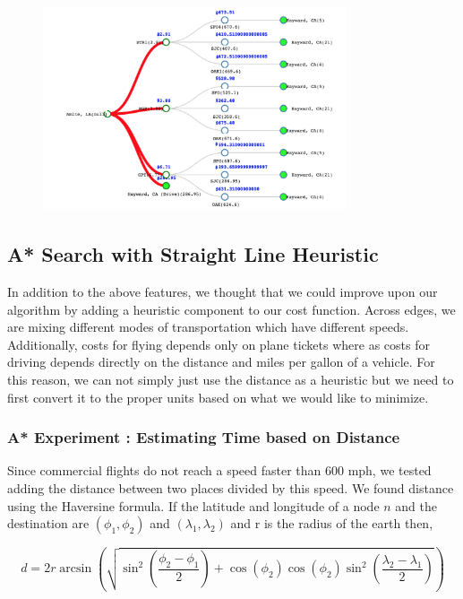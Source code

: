 \documentclass[11pt]{article}
\begin{document}
\begin{figure}[!ht]
  \centering
  \includegraphics[width=0.8\textwidth]{price}
  \label{fig:tprice}
\end{figure}

\pagebreak

\subsection{A* Search with Straight Line Heuristic}

In addition to the above features, we thought that we could improve upon our algorithm by adding a heuristic component to our cost function. 
Across edges, we are mixing different modes of transportation which have different speeds. Additionally, costs for flying depends only on plane tickets where as costs for driving depends directly on the distance and miles per gallon of a vehicle. 
For this reason, we can not simply just use the distance as a heuristic but we need to first convert it to the proper units based on what we would like to minimize.

\subsubsection{A* Experiment : Estimating Time based on Distance}

Since commercial flights do not reach a speed faster than 600 mph, we tested adding the distance between two places divided by this speed. 
We found distance using the Haversine formula. If the latitude and longitude of a node $n$ and the destination are $(\phi_1,\phi_2)$ and $(\lambda_1,\lambda_2)$ and r is the radius of the earth then,

$$d = 2r \arcsin \left( \sqrt{\sin^2 \left(\frac{\phi_2-\phi_1}{2} \right)+\cos(\phi_2) \cos(\phi_2) \sin^2 \left( \frac{\lambda_2 - \lambda_1}{2} \right)} \right)$$
\end{document}
